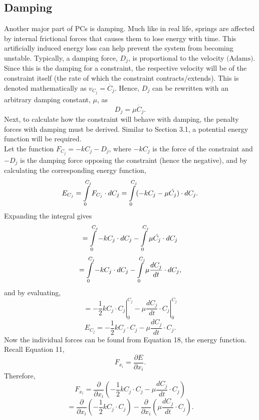\documentclass[12pt, letterpaper]{article}
\begin{document}
\subsection{Damping}
\hspace{\parindent} Another major part of PCs is damping. Much like in real life, springs are affected by internal frictional forces that causes them to lose energy with time. This artificially induced energy loss can help prevent the system from becoming unstable. Typically, a damping force, $D_j$, is proportional to the velocity $\text{(Adams)}$. Since this is the damping for a constraint, the respective velocity will be of the constraint itself (the rate of which the constraint contracts/extends). This is denoted mathematically as $v_{C_j} = \dot{C_j}$. Hence, $D_j$ can be rewritten with an arbitrary damping constant, $\mu$, as
\begin{equation}
    D_j =  \mu \dot{C_j}.
\end{equation}
Next, to calculate how the constraint will behave with damping, the penalty forces with damping must be derived. Similar to Section 3.1, a potential energy function will be required.\\
Let the function $F_{C_j} = -kC_j - D_j$, where $-kC_j$ is the force of the constraint and $- D_j$ is the damping force opposing the constraint (hence the negative), and by calculating the corresponding energy function, 
$$E_{C_j} =  \intop_{0}^{C_j} F_{C_j} \cdot dC_j =  \intop_{0}^{C_j} (-kC_j - \mu \dot{C_j}) \cdot dC_j.$$
Expanding the integral gives
$$=  \intop_{0}^{C_j} -kC_j \cdot dC_j -  \intop_{0}^{C_j} \mu \dot{C_j} \cdot dC_j$$
$$=  \intop_{0}^{C_j} -kC_j \cdot dC_j -  \intop_{0}^{C_j} \mu \frac{d C_j}{d t} \cdot dC_j,$$
and by evaluating,
$$= \left. -\frac{1}{2}kC_j\cdot C_j \right|_{0}^{C_j} - \left. \mu \frac{d C_j}{d t} \cdot C_j \right|_{0}^{C_j}$$
\begin{equation}
   E_{C_j} = - \frac{1}{2} k C_j \cdot C_j - \mu \frac{d C_j}{d t} \cdot C_j. 
\end{equation}
Now the individual forces can be found from Equation 18, the energy function. Recall Equation 11, 
\begin{equation*}
    F_{x_{i}} = \frac{\partial E}{\partial x_{i}}.
\end{equation*}
Therefore,
$$F_{x_{i}} = \frac{\partial}{\partial x_{i}} \left( - \frac{1}{2} k C_j \cdot C_j - \mu \frac{d C_j}{d t} \cdot C_j \right)$$
\begin{equation}
    =\frac{\partial}{\partial x_{i}}\left( -\frac{1}{2} k C_j \cdot C_j \right) - \frac{\partial}{\partial x_{i}} \left(\mu \frac{d C_j}{d t} \cdot C_j \right).
\end{equation}
\end{document}
